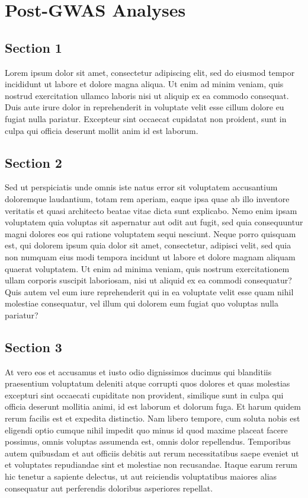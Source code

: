 \documentclass[
]{book}
\begin{document}
\hypertarget{post-gwas-analyses}{%
\chapter{Post-GWAS Analyses}\label{post-gwas-analyses}}

\hypertarget{section-1-2}{%
\section{Section 1}\label{section-1-2}}

Lorem ipsum dolor sit amet, consectetur adipiscing elit, sed do eiusmod tempor incididunt ut labore et dolore magna aliqua. Ut enim ad minim veniam, quis nostrud exercitation ullamco laboris nisi ut aliquip ex ea commodo consequat. Duis aute irure dolor in reprehenderit in voluptate velit esse cillum dolore eu fugiat nulla pariatur. Excepteur sint occaecat cupidatat non proident, sunt in culpa qui officia deserunt mollit anim id est laborum.

\hypertarget{section-2-2}{%
\section{Section 2}\label{section-2-2}}

Sed ut perspiciatis unde omnis iste natus error sit voluptatem accusantium doloremque laudantium, totam rem aperiam, eaque ipsa quae ab illo inventore veritatis et quasi architecto beatae vitae dicta sunt explicabo. Nemo enim ipsam voluptatem quia voluptas sit aspernatur aut odit aut fugit, sed quia consequuntur magni dolores eos qui ratione voluptatem sequi nesciunt. Neque porro quisquam est, qui dolorem ipsum quia dolor sit amet, consectetur, adipisci velit, sed quia non numquam eius modi tempora incidunt ut labore et dolore magnam aliquam quaerat voluptatem. Ut enim ad minima veniam, quis nostrum exercitationem ullam corporis suscipit laboriosam, nisi ut aliquid ex ea commodi consequatur? Quis autem vel eum iure reprehenderit qui in ea voluptate velit esse quam nihil molestiae consequatur, vel illum qui dolorem eum fugiat quo voluptas nulla pariatur?

\hypertarget{section-3-2}{%
\section{Section 3}\label{section-3-2}}

At vero eos et accusamus et iusto odio dignissimos ducimus qui blanditiis praesentium voluptatum deleniti atque corrupti quos dolores et quas molestias excepturi sint occaecati cupiditate non provident, similique sunt in culpa qui officia deserunt mollitia animi, id est laborum et dolorum fuga. Et harum quidem rerum facilis est et expedita distinctio. Nam libero tempore, cum soluta nobis est eligendi optio cumque nihil impedit quo minus id quod maxime placeat facere possimus, omnis voluptas assumenda est, omnis dolor repellendus. Temporibus autem quibusdam et aut officiis debitis aut rerum necessitatibus saepe eveniet ut et voluptates repudiandae sint et molestiae non recusandae. Itaque earum rerum hic tenetur a sapiente delectus, ut aut reiciendis voluptatibus maiores alias consequatur aut perferendis doloribus asperiores repellat.
\end{document}
